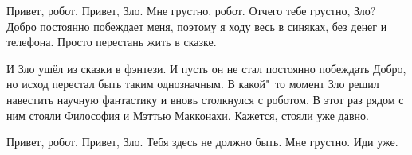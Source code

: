 \begin{dialog}
\X Привет, робот.
\R Привет, Зло.
\X Мне грустно, робот.
\R Отчего тебе грустно, Зло?
\X Добро постоянно побеждает меня, поэтому я ходу весь в синяках, без денег и телефона.
\R Просто перестань жить в сказке.
\end{dialog}

\begin{monolog}
И Зло ушёл из сказки в фэнтези. И пусть он не стал постоянно побеждать Добро, но исход перестал быть таким однозначным. В какой"~то момент Зло решил навестить научную фантастику и вновь столкнулся с роботом. В этот раз рядом с ним стояли Философия и Мэттью Макконахи. Кажется, стояли уже давно.
\end{monolog}

\begin{dialog}
\X Привет, робот.
\R Привет, Зло. Тебя здесь не должно быть.
\X Мне грустно.
\R Иди уже.
\end{dialog}